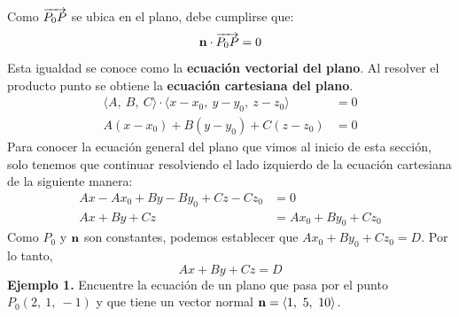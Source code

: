 \documentclass[12pt]{article}
\begin{document}
\begin{figure}[hbt!]
\centering


\end{figure}

Como $\overrightarrow{P_{0}P}$ se ubica en el plano, debe cumplirse que:
\[
  \mathbf{n} \cdot \overrightarrow{P_{0}P} = 0
\]
Esta igualdad se conoce como la \textbf{ecuación vectorial del plano}. Al resolver el producto punto se obtiene la \textbf{ecuación cartesiana del plano}.
\begin{align*}
  \langle A, \ B, \ C \rangle \cdot \langle x - x_{0}, \ y - y_{0}, \ z - z_{0} \rangle &= 0 \\
  A(x - x_{0}) + B(y - y_{0}) + C(z - z_{0}) &= 0
\end{align*}
Para conocer la ecuación general del plano que vimos al inicio de esta sección, solo tenemos que continuar resolviendo el lado izquierdo de la ecuación cartesiana de la siguiente manera:
\begin{align*}
  Ax - Ax_{0} + By - By_{0} + Cz - Cz_{0} &= 0 \\
  Ax + By + Cz &= Ax_{0} + By_{0} + Cz_{0}
\end{align*}
Como $P_{0}$ y $\mathbf{n}$ son constantes, podemos establecer que $Ax_{0} + By_{0} + Cz_{0} = D$. Por lo tanto,
\[
  Ax + By + Cz = D
\]
\textbf{Ejemplo 1.} Encuentre la ecuación de un plano que pasa por el punto $P_{0}(2, \ 1, \ -1)$ y que tiene un vector normal $\mathbf{n} = \langle 1, \ 5, \ 10 \rangle$.
\end{document}
